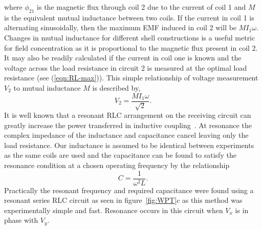 \documentclass[11pt]{iopart}
\begin{document}
where $\phi_{21}$ is the magnetic flux through coil 2 due to the
current of coil 1 and $M$ is the equivalent mutual inductance between
two coils.
If the current in coil 1 is alternating sinusoidally, then the
maximum EMF induced in coil 2 will be $M I_1 \omega$. Changes in
mutual inductance for different shell constructions is a useful metric
for field concentration as it is proportional to the magnetic flux
present in coil 2. It may also be readily calculated if the current in
coil one is known and the voltage across the load resistance in
circuit 2 is measured at the optimal load resistance
(see (\ref{eqn:RL-max})). This simple relationship of voltage
measurement $V_2$ to mutual inductance $M$ is described by,
\begin{equation}
  V_2 = \frac{MI_1\omega}{\sqrt{2}}.
\label{eqn:MVs}
\end{equation}
It is well known that a resonant RLC arrangement on the receiving
circuit can greatly increase the power transferred in inductive
coupling~\cite{Hirai2000}.  At resonance the complex impedance of the inductance
and capacitance cancel leaving only the load resistance. Our
inductance is assumed to be identical between experiments as the same
coils are used and the capacitance can be found to satisfy the
resonance condition at a chosen operating frequency by the
relationship
\begin{equation}
  C = \frac{1}{\omega^2L}.
  \label{eqn:RLC-res}
\end{equation}
Practically the resonant frequency and required capacitance were found
using a resonant series RLC circuit as seen in
figure~\ref{fig:WPT}$c$ as this method was experimentally
simple and fast. Resonance occurs in this circuit when $V_x$ is in phase with
$V_y$.
\end{document}
